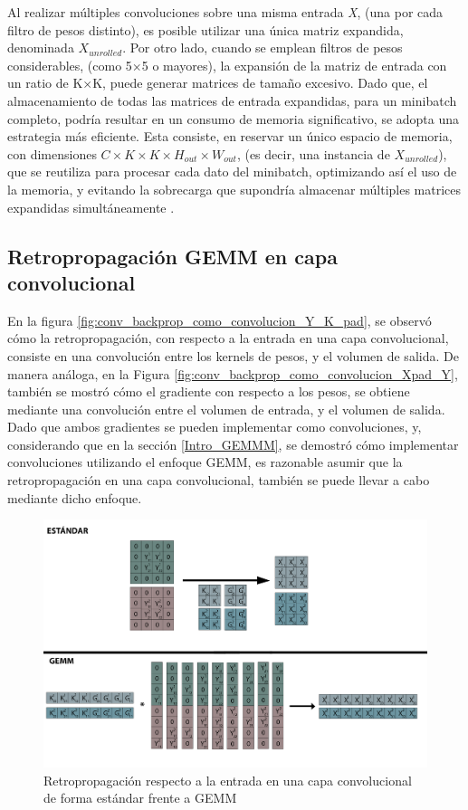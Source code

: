 Al realizar múltiples convoluciones sobre una misma entrada \textit{X}, (una por cada filtro de pesos distinto), es posible utilizar una única matriz expandida, denominada $X_{unrolled}$. Por otro lado, cuando se emplean filtros de pesos considerables, (como 5$\times$5 o mayores), la expansión de la matriz de entrada con un ratio de K$\times$K, puede generar matrices de tamaño excesivo. Dado que, el almacenamiento de todas las matrices de entrada expandidas, para un minibatch completo, podría resultar en un consumo de memoria significativo, se adopta una estrategia más eficiente. Esta consiste, en reservar un único espacio de memoria, con dimensiones $C \times K \times K \times H_{out} \times W_{out}$, (es decir, una instancia de $X_{unrolled}$), que se reutiliza para procesar cada dato del minibatch, optimizando así el uso de la memoria, y evitando la sobrecarga que supondría almacenar múltiples matrices expandidas simultáneamente \cite{Programming_Massively}.

\subsection{Retropropagación GEMM en capa convolucional}

En la figura \ref{fig:conv_backprop_como_convolucion_Y_K_pad}, se observó cómo la retropropagación, con respecto a la entrada en una capa convolucional, consiste en una convolución entre los kernels de pesos, y el volumen de salida. De manera análoga, en la Figura \ref{fig:conv_backprop_como_convolucion_Xpad_Y}, también se mostró cómo el gradiente con respecto a los pesos, se obtiene mediante una convolución entre el volumen de entrada, y el volumen de salida. \\
Dado que ambos gradientes se pueden implementar como convoluciones, y, considerando que en la sección \ref{Intro_GEMMM}, se demostró cómo implementar convoluciones utilizando el enfoque GEMM, es razonable asumir que la retropropagación en una capa convolucional, también se puede llevar a cabo mediante dicho enfoque.

\begin{figure}[H]
	\hspace{-40mm}
	\includegraphics[scale=0.3]{imagenes/conv_std_vs_gemm_backprop.jpg}  
	\caption{Retropropagación respecto a la entrada en una capa convolucional de forma estándar frente a GEMM}
	\label{fig:conv_std_vs_gemm_backprop}
\end{figure}

